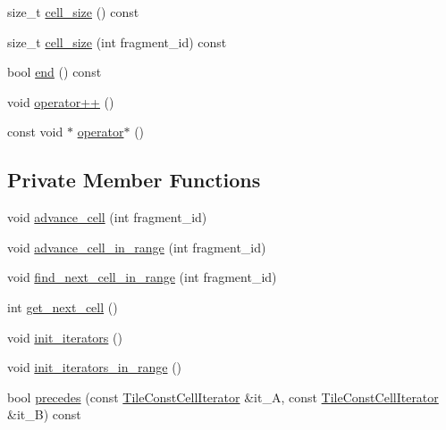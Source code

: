 \begin{DoxyCompactItemize}
\item 
size\+\_\+t \hyperlink{classArrayConstCellIterator_a73162f2f592c3bf7b97dc358f93577d5}{cell\+\_\+size} () const 
\item 
size\+\_\+t \hyperlink{classArrayConstCellIterator_a6a762e0efef9c480d887bd4807063f98}{cell\+\_\+size} (int fragment\+\_\+id) const 
\item 
bool \hyperlink{classArrayConstCellIterator_a1ea089f161c9be24f75ad0cac765975b}{end} () const 
\item 
void \hyperlink{classArrayConstCellIterator_aa349749a9255496ae89a5b85706540fe}{operator++} ()
\item 
const void $\ast$ \hyperlink{classArrayConstCellIterator_a625a31c4ca34ca068445454d00099bf1}{operator$\ast$} ()
\end{DoxyCompactItemize}
\subsection*{Private Member Functions}
\begin{DoxyCompactItemize}
\item 
void \hyperlink{classArrayConstCellIterator_a70db480cf8c410b93ab4db42a38ba2bd}{advance\+\_\+cell} (int fragment\+\_\+id)
\item 
void \hyperlink{classArrayConstCellIterator_a1efd9fefa3ff8dec629765026cb0e864}{advance\+\_\+cell\+\_\+in\+\_\+range} (int fragment\+\_\+id)
\item 
void \hyperlink{classArrayConstCellIterator_a55dc9548040d26d07516605bd407d88a}{find\+\_\+next\+\_\+cell\+\_\+in\+\_\+range} (int fragment\+\_\+id)
\item 
int \hyperlink{classArrayConstCellIterator_a8890d06d8911065ab8fbc72736570023}{get\+\_\+next\+\_\+cell} ()
\item 
void \hyperlink{classArrayConstCellIterator_a2d48007dd3ab432405b4d3c66f3886b7}{init\+\_\+iterators} ()
\item 
void \hyperlink{classArrayConstCellIterator_a3293b8ff707efc41be1a49ca890f737e}{init\+\_\+iterators\+\_\+in\+\_\+range} ()
\item 
bool \hyperlink{classArrayConstCellIterator_ad7207a1abaaa785d1cf728513ad333cf}{precedes} (const \hyperlink{classTileConstCellIterator}{Tile\+Const\+Cell\+Iterator} \&it\+\_\+\+A, const \hyperlink{classTileConstCellIterator}{Tile\+Const\+Cell\+Iterator} \&it\+\_\+\+B) const 
\end{DoxyCompactItemize}
